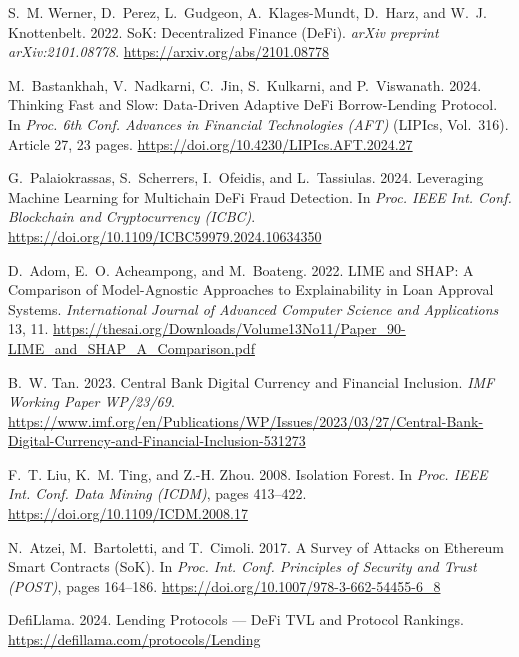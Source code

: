 \documentclass[12pt,a4paper]{report}
\begin{document}
{\small
\begin{enumerate}[label={[\arabic*]}]
\item S.~M. Werner, D.~Perez, L.~Gudgeon, A.~Klages-Mundt, D.~Harz, and W.~J. Knottenbelt. 2022. SoK: Decentralized Finance (DeFi). \emph{arXiv preprint arXiv:2101.08778}. \url{https://arxiv.org/abs/2101.08778}


\item M.~Bastankhah, V.~Nadkarni, C.~Jin, S.~Kulkarni, and P.~Viswanath. 2024. Thinking Fast and Slow: Data-Driven Adaptive DeFi Borrow-Lending Protocol. In \emph{Proc. 6th Conf. Advances in Financial Technologies (AFT)} (LIPIcs, Vol.~316). Article 27, 23 pages. \url{https://doi.org/10.4230/LIPIcs.AFT.2024.27}


\item G.~Palaiokrassas, S.~Scherrers, I.~Ofeidis, and L.~Tassiulas. 2024. Leveraging Machine Learning for Multichain DeFi Fraud Detection. In \emph{Proc. IEEE Int. Conf. Blockchain and Cryptocurrency (ICBC)}. \url{https://doi.org/10.1109/ICBC59979.2024.10634350}


\item D.~Adom, E.~O. Acheampong, and M.~Boateng. 2022. LIME and SHAP: A Comparison of Model-Agnostic Approaches to Explainability in Loan Approval Systems. \emph{International Journal of Advanced Computer Science and Applications} 13, 11. \url{https://thesai.org/Downloads/Volume13No11/Paper_90-LIME_and_SHAP_A_Comparison.pdf}


\item B.~W. Tan. 2023. Central Bank Digital Currency and Financial Inclusion. \emph{IMF Working Paper WP/23/69}. \url{https://www.imf.org/en/Publications/WP/Issues/2023/03/27/Central-Bank-Digital-Currency-and-Financial-Inclusion-531273}


\item F.~T. Liu, K.~M. Ting, and Z.-H. Zhou. 2008. Isolation Forest. In \emph{Proc. IEEE Int. Conf. Data Mining (ICDM)}, pages 413--422. \url{https://doi.org/10.1109/ICDM.2008.17}


\item N.~Atzei, M.~Bartoletti, and T.~Cimoli. 2017. A Survey of Attacks on Ethereum Smart Contracts (SoK). In \emph{Proc. Int. Conf. Principles of Security and Trust (POST)}, pages 164--186. \url{https://doi.org/10.1007/978-3-662-54455-6_8}


\item DefiLlama. 2024. Lending Protocols --- DeFi TVL and Protocol Rankings. \url{https://defillama.com/protocols/Lending}



\end{enumerate}}
\end{document}
